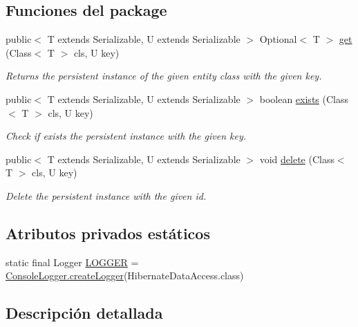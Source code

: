 \subsection*{Funciones del \textquotesingle{}package\textquotesingle{}}
\begin{DoxyCompactItemize}
\item 
public$<$ T extends Serializable, U extends Serializable $>$ Optional$<$ T $>$ \mbox{\hyperlink{a00144_a0620c099395860e9df083998f4f73f7d}{get}} (Class$<$ T $>$ cls, U key)
\begin{DoxyCompactList}\small\item\em Returns the persistent instance of the given entity class with the given key. \end{DoxyCompactList}\item 
public$<$ T extends Serializable, U extends Serializable $>$ boolean \mbox{\hyperlink{a00144_a0f782c671d6feb48f69a3128fe5e3484}{exists}} (Class$<$ T $>$ cls, U key)
\begin{DoxyCompactList}\small\item\em Check if exists the persistent instance with the given key. \end{DoxyCompactList}\item 
public$<$ T extends Serializable, U extends Serializable $>$ void \mbox{\hyperlink{a00144_a4f8656939c9f559fa536850957dce8ce}{delete}} (Class$<$ T $>$ cls, U key)
\begin{DoxyCompactList}\small\item\em Delete the persistent instance with the given id. \end{DoxyCompactList}\end{DoxyCompactItemize}
\subsection*{Atributos privados estáticos}
\begin{DoxyCompactItemize}
\item 
static final Logger \mbox{\hyperlink{a00144_a3f050c37956274b82491f5fcf9ce5db1}{L\+O\+G\+G\+ER}} = \mbox{\hyperlink{a00220_a520321643663e37d95761134a35505cd}{Console\+Logger.\+create\+Logger}}(Hibernate\+Data\+Access.\+class)
\end{DoxyCompactItemize}


\subsection{Descripción detallada}


